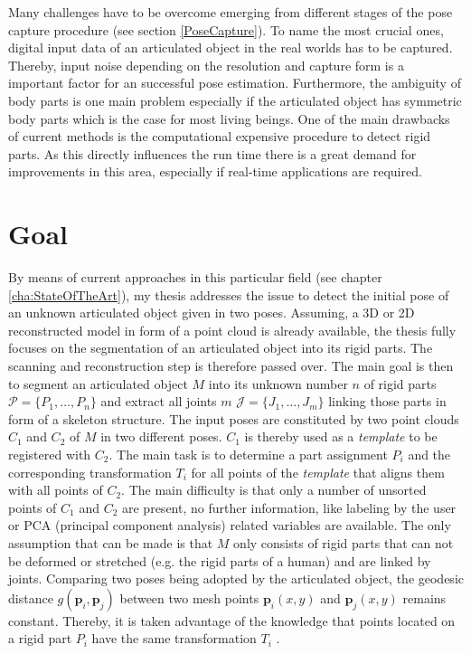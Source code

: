Many challenges have to be overcome emerging from different stages of the pose capture procedure (see section \ref{PoseCapture}). To name the most crucial ones, digital input data of an articulated object in the real worlds has to be captured. Thereby, input noise depending on the resolution and capture form is a important factor for an successful pose estimation. Furthermore, the ambiguity of body parts is one main problem especially if the articulated object has symmetric body parts which is the case for most living beings. One of the main drawbacks of current methods is the computational expensive procedure to detect rigid parts. As this directly influences the run time there is a great demand for improvements in this area, especially if real-time applications are required.

\section{Goal}

By means of current approaches in this particular field (see chapter \ref{cha:StateOfTheArt}), my thesis addresses the issue to detect the initial pose of an unknown articulated object given in two poses. Assuming, a 3D or 2D reconstructed model in form of a point cloud is already available, the thesis fully focuses on the segmentation of an articulated object into its rigid parts. The scanning and reconstruction step is therefore passed over. The main goal is then to segment an articulated object $M$ into its unknown number $n$ of rigid parts $\mathcal{P} =  \{P_1,\ldots,P_n\}$ and extract all joints $m$ $\mathcal{J} =  \{J_1,\ldots,J_m\}$ linking those parts in form of a skeleton structure. The input poses are constituted by two point clouds $C_1$ and $C_2$ of $M$ in two different poses. $C_1$ is thereby used as a \textit{template} to be registered with $C_2$. The main task is to determine a part assignment $P_i$ and the corresponding transformation $T_i$ for all points of the \textit{template} that aligns them with all points of $C_2$. The main difficulty is that only a number of unsorted points of $C_1$ and $C_2$ are present, no further information, like labeling by the user or PCA (principal component analysis) related variables are available. The only assumption that can be made is that $M$ only consists of rigid parts that can not be deformed or stretched (e.g. the rigid parts of a human) and are linked by joints. Comparing two poses being adopted by the articulated object, the geodesic distance $g(\boldsymbol{p}_i,\boldsymbol{p}_j)$ between two mesh points $\boldsymbol{p}_i(x,y)$ and $\boldsymbol{p}_j(x,y)$ remains constant. Thereby, it is taken advantage of the knowledge that points located on a rigid part $P_i$ have the same transformation $T_i$ .

